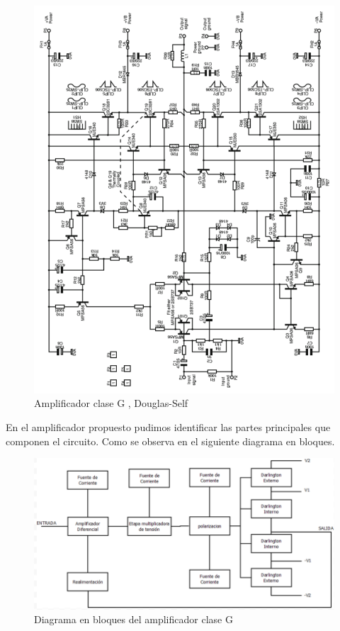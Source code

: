 \documentclass[a4paper,12pt,twoside]{article}
\begin{document}
\begin{figure}[H]
	\centering
	\includegraphics[scale=0.70]{img/ampli_douglas}
	\caption{Amplificador clase G , Douglas-Self}
	\label{douglas}
\end{figure}

\newpage
En el amplificador propuesto pudimos identificar las partes principales que componen el circuito. Como se observa en el siguiente diagrama en bloques.

\begin{figure}[H]
	\centering
	\includegraphics[scale=0.75]{img/ampli_bloques}
	\caption{Diagrama en bloques del amplificador clase G}
	\label{fig.1}
\end{figure}
\end{document}
